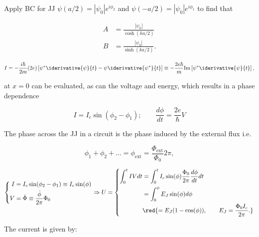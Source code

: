   \noindent Apply BC for JJ $\psi(a/2) = \left|\psi_0\right|e^{i\phi_2}$ and $\psi(-a/2) = \left|\psi_0\right|e^{i\phi_1}$ to find that
  
  \begin{align}
  A &= \frac{\left|\psi_0\right|}{\cosh(ka/2)}\\
  B &= \frac{\left|\psi_0\right|}{\sinh(ka/2)}.
  \end{align}
  
  
  \begin{equation}
  I = -\frac{i\hbar}{2m}(2e)\left[\psi^*\iderivative{\psi}{t}-\psi\iderivative{\psi^*}{t}\right] \equiv -\frac{2e\hbar}{m}\text{Im}\left[\psi^*\iderivative{\psi}{t}\right],
  \end{equation}
  
  \noindent at $x=0$ can be evaluated, as can the voltage and energy, which results in a phase dependence
  
  \begin{equation}
  \label{l2-dcac}
  I = I_c\sin(\phi_2-\phi_1); \qquad \frac{d\phi}{dt} = \frac{2e}{\hbar}V
  \end{equation}
  
  The phase across the JJ in a circuit is the phase induced by the external flux i.e.
  
  \begin{equation}
  \label{eqn:l2-phasesum}
  \phi_1+\phi_2+\ldots = \phi_\text{ext} = \frac{\Phi_\text{ext}}{\Phi_0}2\pi,
  \end{equation}
  
  \begin{equation}
  \left\lbrace\begin{aligned}
  I &= I_c\sin(\phi_2-\phi_1)\equiv I_c\sin(\phi)\\
  V&=\dot{\Phi} \equiv \frac{\dot{\phi}}{2\pi}\Phi_0
  \end{aligned}\right. \Rightarrow U = \left\lbrace\begin{aligned}
  \int_{0}^{t}IV dt & = \int_{0}^{t}I_c\sin(\phi)\frac{\Phi_0}{2\pi}\frac{d\phi}{dt}dt\\
  & = \int_{0}^{\phi} E_J\sin(\phi)d\phi\\
  & \red{= E_J(1-\cos(\phi)),\qquad E_J = \frac{\Phi_0I_c}{2\pi}.}
  \end{aligned}\right.
  \label{l2-JJEnergy}
  \end{equation} 
  
  \noindent The current is given by:
  
